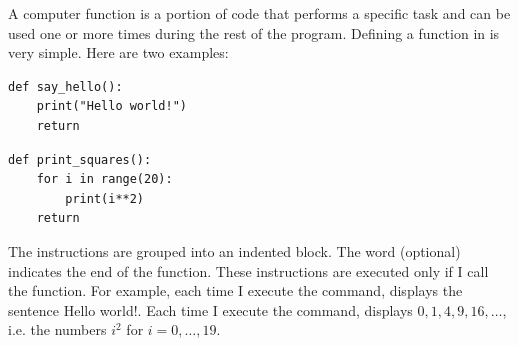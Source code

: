 \documentclass[11pt,class=report,crop=false]{standalone}
\begin{document}




\begin{cours}


A computer function is a portion of code that performs a specific task and can be used one or more times during the rest of the program. 
Defining a function in \Python{} is very simple. 
Here are two examples:
\begin{center}
\begin{minipage}{0.4\textwidth}
\begin{lstlisting}
def say_hello():
    print("Hello world!")
    return
\end{lstlisting}
\end{minipage}\qquad\qquad
\begin{minipage}{0.4\textwidth}
\begin{lstlisting}
def print_squares():
    for i in range(20):
        print(i**2)
    return
\end{lstlisting}
\end{minipage}
\end{center}


The instructions are grouped into an indented block. The word  (optional) indicates the end of the function. These instructions are executed only if I call the function. For example, each time I execute the  command, \Python{} displays the sentence \og{}Hello world!\fg{}. Each time I execute the  command, \Python{} displays $0,1,4,9,16,\ldots$, i.e. the numbers $i^2$ for $i=0,\ldots,19$.



\end{cours}
\end{document}
